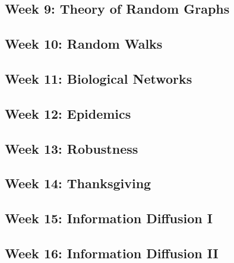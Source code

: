 \documentclass[11pt,article,oneside]{memoir}
\begin{document}
\subsection{Week 9:  Theory of Random Graphs}
\subsection{Week 10: Random Walks}
\subsection{Week 11: Biological Networks}
\subsection{Week 12: Epidemics}
\subsection{Week 13: Robustness}
\subsection{Week 14: Thanksgiving}
\subsection{Week 15: Information Diffusion I}
\subsection{Week 16: Information Diffusion II}
\end{document}
